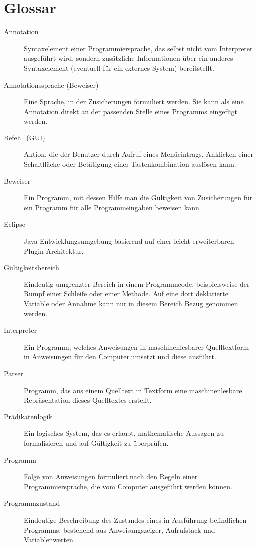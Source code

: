 \section{Glossar}


\begin{description}
    \item[Annotation] Syntaxelement einer Programmiersprache, das selbst nicht vom Interpreter ausgeführt wird, sondern zusätzliche Informationen über ein anderes Syntaxelement (eventuell für ein externes System) bereitstellt.  
    \item[Annotationssprache (Beweiser)] Eine Sprache, in der \see Zusicherungen formuliert werden. Sie kann als eine Annotation direkt an der passenden Stelle eines Programms eingefügt werden.
    \item[Befehl~(GUI)] Aktion, die der Benutzer durch Aufruf eines Menüeintrags, Anklicken einer Schaltfläche oder Betätigung einer Tastenkombination auslösen kann.
    \item[Beweiser] Ein Programm, mit dessen Hilfe man die Gültigkeit von Zusicherungen für ein Programm für alle Programmeingaben beweisen kann.
    \item[Eclipse] Java-Entwicklungsumgebung basierend auf einer leicht erweiterbaren Plugin-Architektur.
    \item[Gültigkeitsbereich] Eindeutig umgrenzter Bereich in einem Programmcode, beispielsweise der Rumpf einer Schleife oder einer Methode. Auf eine dort deklarierte Variable oder Annahme kann nur in diesem Bereich Bezug genommen werden.
    \item[Interpreter] Ein Programm, welches Anweisungen in maschinenlesbarer Quelltextform in Anweisungen für den Computer umsetzt und diese ausführt.  
    \item[Parser] Programm, das aus einem Quelltext in Textform eine maschinenlesbare Repräsentation dieses Quelltextes erstellt. 
    \item[Prädikatenlogik] Ein logisches System, das es erlaubt, mathematische Aussagen zu formalisieren und auf Gültigkeit zu überprüfen. %
    \item[Programm] Folge von Anweisungen formuliert nach den Regeln einer Programmiersprache, die vom Computer ausgeführt werden können.
    \item[Programmzustand] Eindeutige Beschreibung des Zustandes eines in Ausführung befindlichen Programms, bestehend aus Anweisungszeiger, Aufrufstack und Variablenwerten.   

\end{description}
